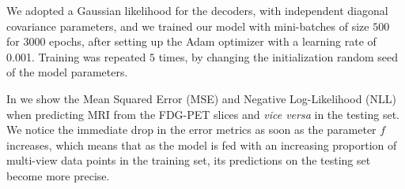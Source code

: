{	We adopted a Gaussian likelihood for the decoders, with independent diagonal covariance parameters, and
	we trained our model with mini-batches of size $500$ for $3000$ epochs, after setting up the Adam optimizer with a learning rate of 0.001.
	Training was repeated $5$ times, by changing the initialization random seed of the model parameters.
%	
	
	
	In  we show the Mean Squared Error (MSE) and Negative Log-Likelihood (NLL) when predicting MRI from the FDG-PET slices and \textit{vice versa} in the testing set.
	We notice the immediate drop in the error metrics as soon as the parameter $f$ increases,
	which means that as the model is fed with an increasing proportion of multi-view data points in the training set,
	its predictions on the testing set become more precise.
}
